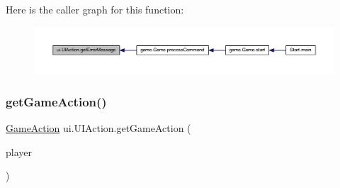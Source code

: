Here is the caller graph for this function\+:
\nopagebreak
\begin{figure}[H]
\begin{center}
\leavevmode
\includegraphics[width=350pt]{classui_1_1_u_i_action_a2fefd7ed6431b92c2215776bf64552b0_icgraph}
\end{center}
\end{figure}
\mbox{\label{classui_1_1_u_i_action_a3185db453138fe37b085f1427f7aca62}} 
\subsubsection{\texorpdfstring{get\+Game\+Action()}{getGameAction()}}
{\footnotesize\ttfamily \mbox{\hyperlink{classrule_engine_1_1_game_action}{Game\+Action}} ui.\+U\+I\+Action.\+get\+Game\+Action (\begin{DoxyParamCaption}\item[{\mbox{\hyperlink{enumgame_1_1_e_player}{E\+Player}}}]{player }\end{DoxyParamCaption})\hspace{0.3cm}{\ttfamily [inline]}}


